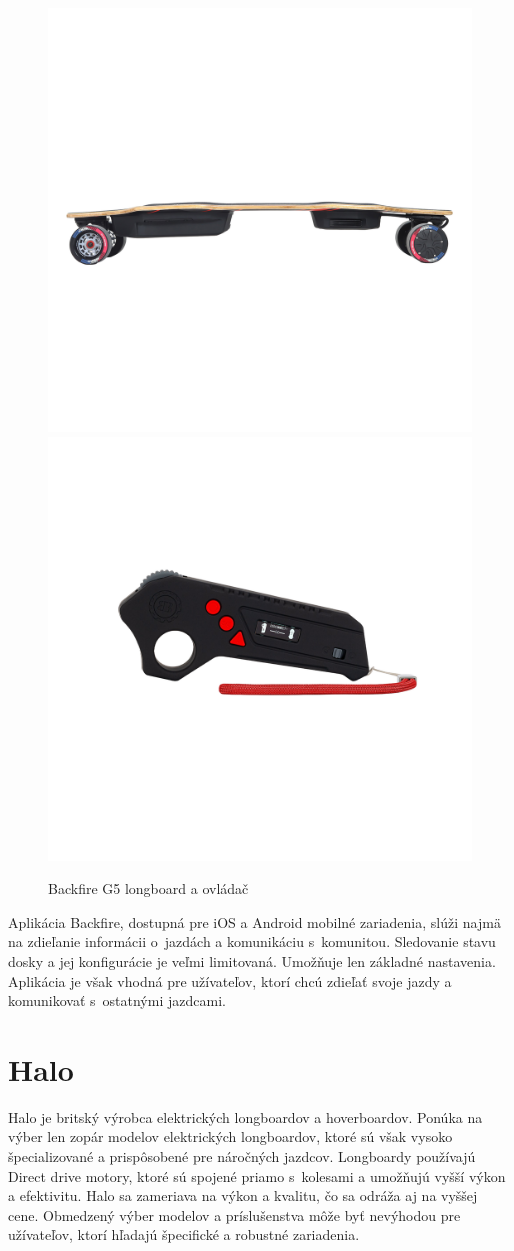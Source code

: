 \begin{figure}[h]
    \centering
    \includegraphics[width=0.48\linewidth]{figures/brand-reviews/backfire-longboard.png}\hfill
    \includegraphics[width=0.48\linewidth]{figures/brand-reviews/backfire-controller.png}
    \caption{Backfire G5 longboard a ovládač\cite{Backfire}}\label{fig:backfire}
\end{figure}

Aplikácia Backfire, dostupná pre iOS a Android mobilné zariadenia, slúži najmä na zdieľanie informácii o~jazdách a komunikáciu s~komunitou.
Sledovanie stavu dosky a jej konfigurácie je veľmi limitovaná.
Umožňuje len základné nastavenia.
Aplikácia je však vhodná pre užívateľov, ktorí chcú zdieľať svoje jazdy a komunikovať s~ostatnými jazdcami.\cite{Backfire}

\section{Halo}
Halo je britský výrobca elektrických longboardov a hoverboardov.
Ponúka na výber len zopár modelov elektrických longboardov, ktoré sú však vysoko špecializované a prispôsobené pre náročných jazdcov.
Longboardy používajú Direct drive motory, ktoré sú spojené priamo s~kolesami a umožňujú vyšší výkon a efektivitu.
Halo sa zameriava na výkon a kvalitu, čo sa odráža aj na vyššej cene.
Obmedzený výber modelov a príslušenstva môže byť nevýhodou pre užívateľov, ktorí hľadajú špecifické a robustné zariadenia.

